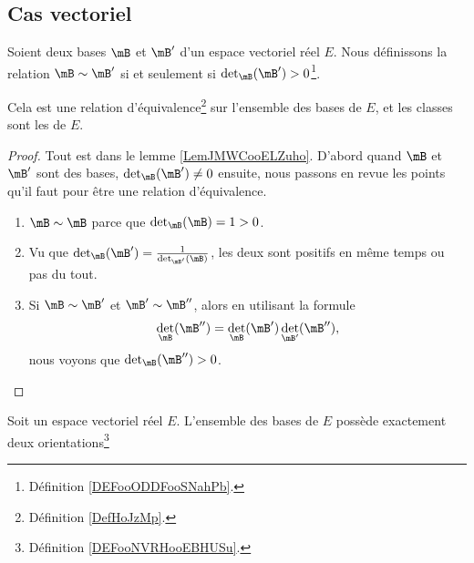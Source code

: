 \subsection{Cas vectoriel}

\begin{propositionDef}        \label{DEFooNVRHooEBHUSu}
	Soient deux bases \( \mB\) et \( \mB'\) d'un espace vectoriel réel \( E\). Nous définissons la relation \( \mB\sim \mB'\) si et seulement si \( \det_{\mB}(\mB')>0\)\footnote{Définition \ref{DEFooODDFooSNahPb}.}.

	Cela est une relation d'équivalence\footnote{Définition \ref{DefHoJzMp}.} sur l'ensemble des bases de \( E\), et les classes sont les  de \( E\).
\end{propositionDef}

\begin{proof}
	Tout est dans le lemme \ref{LemJMWCooELZuho}. D'abord quand \( \mB\) et \( \mB'\) sont des bases, \( \det_{\mB}(\mB')\neq 0\) ensuite, nous passons en revue les points qu'il faut pour être une relation d'équivalence.
	\begin{enumerate}
		\item
		      \( \mB\sim \mB\) parce que \( \det_{\mB}(\mB)=1>0\).
		\item
		      Vu que \( \det_{\mB}(\mB')=\frac{1}{ \det_{\mB'}(\mB) }\), les deux sont positifs en même temps ou pas du tout.
		\item
		      Si \( \mB\sim \mB'\) et \( \mB'\sim\mB''\), alors en utilisant la formule
		      \begin{equation}
			      \det_{\mB}(\mB'')=\det_{\mB}(\mB')\det_{\mB'}(\mB''),
		      \end{equation}
		      nous voyons que \( \det_{\mB}(\mB'')>0\).
	\end{enumerate}
\end{proof}

\begin{lemma}
	Soit un espace vectoriel réel \( E\). L'ensemble des bases de \( E\) possède exactement deux orientations\footnote{Définition \ref{DEFooNVRHooEBHUSu}.}
\end{lemma}

